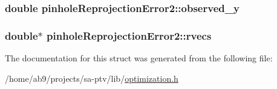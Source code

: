 \hypertarget{structpinholeReprojectionError2_a93f2d305e8efff21397d6103439721b1}{
\subsubsection[{observed\-\_\-y}]{\setlength{\rightskip}{0pt plus 5cm}double pinhole\-Reprojection\-Error2\-::observed\-\_\-y}}\label{d7/d56/structpinholeReprojectionError2_a93f2d305e8efff21397d6103439721b1}
\hypertarget{structpinholeReprojectionError2_af1afb81c570c7bf8d497a8ecf1cc7e69}{
\subsubsection[{rvecs}]{\setlength{\rightskip}{0pt plus 5cm}double$\ast$ pinhole\-Reprojection\-Error2\-::rvecs}}\label{d7/d56/structpinholeReprojectionError2_af1afb81c570c7bf8d497a8ecf1cc7e69}


The documentation for this struct was generated from the following file\-:\begin{DoxyCompactItemize}
\item 
/home/ab9/projects/sa-\/ptv/lib/\hyperlink{optimization_8h}{optimization.\-h}\end{DoxyCompactItemize}
